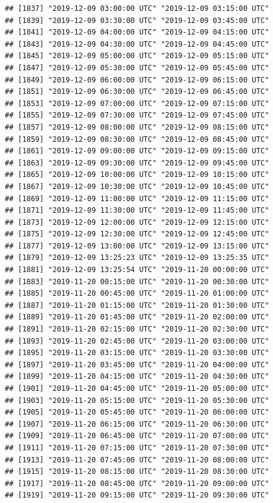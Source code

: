 \documentclass{article}\usepackage[]{graphicx}\usepackage[]{color}
\makeatletter
\newenvironment{kframe}{%
 \def\at@end@of@kframe{}%
 \ifinner\ifhmode%
  \def\at@end@of@kframe{\end{minipage}}%
  \begin{minipage}{\columnwidth}%
 \fi\fi%
 \def\FrameCommand##1{\hskip\@totalleftmargin \hskip-\fboxsep
 \colorbox{shadecolor}{##1}\hskip-\fboxsep
     \hskip-\linewidth \hskip-\@totalleftmargin \hskip\columnwidth}%
 \MakeFramed {\advance\hsize-\width
   \@totalleftmargin\z@ \linewidth\hsize
   \@setminipage}}%
 {\par\unskip\endMakeFramed%
 \at@end@of@kframe}
\newenvironment{knitrout}{}{} %
\makeatother
\begin{document}
\begin{knitrout}
\begin{kframe}
\begin{verbatim}
## [1837] "2019-12-09 03:00:00 UTC" "2019-12-09 03:15:00 UTC"
## [1839] "2019-12-09 03:30:00 UTC" "2019-12-09 03:45:00 UTC"
## [1841] "2019-12-09 04:00:00 UTC" "2019-12-09 04:15:00 UTC"
## [1843] "2019-12-09 04:30:00 UTC" "2019-12-09 04:45:00 UTC"
## [1845] "2019-12-09 05:00:00 UTC" "2019-12-09 05:15:00 UTC"
## [1847] "2019-12-09 05:30:00 UTC" "2019-12-09 05:45:00 UTC"
## [1849] "2019-12-09 06:00:00 UTC" "2019-12-09 06:15:00 UTC"
## [1851] "2019-12-09 06:30:00 UTC" "2019-12-09 06:45:00 UTC"
## [1853] "2019-12-09 07:00:00 UTC" "2019-12-09 07:15:00 UTC"
## [1855] "2019-12-09 07:30:00 UTC" "2019-12-09 07:45:00 UTC"
## [1857] "2019-12-09 08:00:00 UTC" "2019-12-09 08:15:00 UTC"
## [1859] "2019-12-09 08:30:00 UTC" "2019-12-09 08:45:00 UTC"
## [1861] "2019-12-09 09:00:00 UTC" "2019-12-09 09:15:00 UTC"
## [1863] "2019-12-09 09:30:00 UTC" "2019-12-09 09:45:00 UTC"
## [1865] "2019-12-09 10:00:00 UTC" "2019-12-09 10:15:00 UTC"
## [1867] "2019-12-09 10:30:00 UTC" "2019-12-09 10:45:00 UTC"
## [1869] "2019-12-09 11:00:00 UTC" "2019-12-09 11:15:00 UTC"
## [1871] "2019-12-09 11:30:00 UTC" "2019-12-09 11:45:00 UTC"
## [1873] "2019-12-09 12:00:00 UTC" "2019-12-09 12:15:00 UTC"
## [1875] "2019-12-09 12:30:00 UTC" "2019-12-09 12:45:00 UTC"
## [1877] "2019-12-09 13:00:00 UTC" "2019-12-09 13:15:00 UTC"
## [1879] "2019-12-09 13:25:23 UTC" "2019-12-09 13:25:35 UTC"
## [1881] "2019-12-09 13:25:54 UTC" "2019-11-20 00:00:00 UTC"
## [1883] "2019-11-20 00:15:00 UTC" "2019-11-20 00:30:00 UTC"
## [1885] "2019-11-20 00:45:00 UTC" "2019-11-20 01:00:00 UTC"
## [1887] "2019-11-20 01:15:00 UTC" "2019-11-20 01:30:00 UTC"
## [1889] "2019-11-20 01:45:00 UTC" "2019-11-20 02:00:00 UTC"
## [1891] "2019-11-20 02:15:00 UTC" "2019-11-20 02:30:00 UTC"
## [1893] "2019-11-20 02:45:00 UTC" "2019-11-20 03:00:00 UTC"
## [1895] "2019-11-20 03:15:00 UTC" "2019-11-20 03:30:00 UTC"
## [1897] "2019-11-20 03:45:00 UTC" "2019-11-20 04:00:00 UTC"
## [1899] "2019-11-20 04:15:00 UTC" "2019-11-20 04:30:00 UTC"
## [1901] "2019-11-20 04:45:00 UTC" "2019-11-20 05:00:00 UTC"
## [1903] "2019-11-20 05:15:00 UTC" "2019-11-20 05:30:00 UTC"
## [1905] "2019-11-20 05:45:00 UTC" "2019-11-20 06:00:00 UTC"
## [1907] "2019-11-20 06:15:00 UTC" "2019-11-20 06:30:00 UTC"
## [1909] "2019-11-20 06:45:00 UTC" "2019-11-20 07:00:00 UTC"
## [1911] "2019-11-20 07:15:00 UTC" "2019-11-20 07:30:00 UTC"
## [1913] "2019-11-20 07:45:00 UTC" "2019-11-20 08:00:00 UTC"
## [1915] "2019-11-20 08:15:00 UTC" "2019-11-20 08:30:00 UTC"
## [1917] "2019-11-20 08:45:00 UTC" "2019-11-20 09:00:00 UTC"
## [1919] "2019-11-20 09:15:00 UTC" "2019-11-20 09:30:00 UTC"

\end{verbatim}
\end{kframe}
\end{knitrout}
\end{document}
